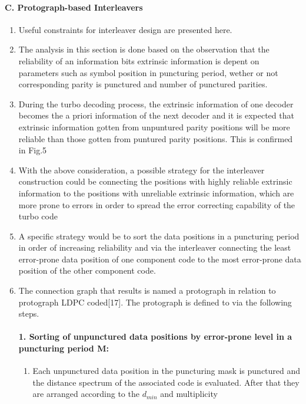 \documentclass[fontsize=12pt]{article}
\begin{document}
\paragraph{C. Protograph-based Interleavers}
\begin{enumerate}
\item Useful constraints for interleaver design are presented here.

\item The analysis in this section is done based on the observation that the reliability of an information bits extrinsic information is depent on parameters such as symbol position in puncturing period, wether or not corresponding parity is punctured and number of punctured parities.

\item During the turbo decoding process, the extrinsic information of one decoder becomes the a priori information of the next decoder and it is expected that extrinsic information gotten from unpuntured parity positions will be more reliable than those gotten from puntured parity positions. This is confirmed in Fig.5

\item With the above consideration, a possible strategy for the interleaver construction could be connecting the positions with highly reliable extrinsic information to the positions with unreliable extrinsic information, which are more prone to errors in order to spread the error correcting capability of the turbo code

\item A specific strategy would be to sort the data positions in a puncturing period in order of increasing reliability and via the interleaver connecting the least error-prone data position of one component code to the most error-prone data position of the other component code.

\item The connection graph that results is named a protograph in relation to protograph LDPC coded[17]. The protograph is defined to via the following steps.

\paragraph{1. Sorting of unpunctured data positions by error-prone
level in a puncturing period M:}
\begin{enumerate}
\item Each unpunctured data position in the puncturing mask is punctured and the distance spectrum of the associated code is evaluated. After that they are arranged according to the $d_{min}$ and multiplicity


\end{enumerate}
\end{enumerate}
\end{document}
